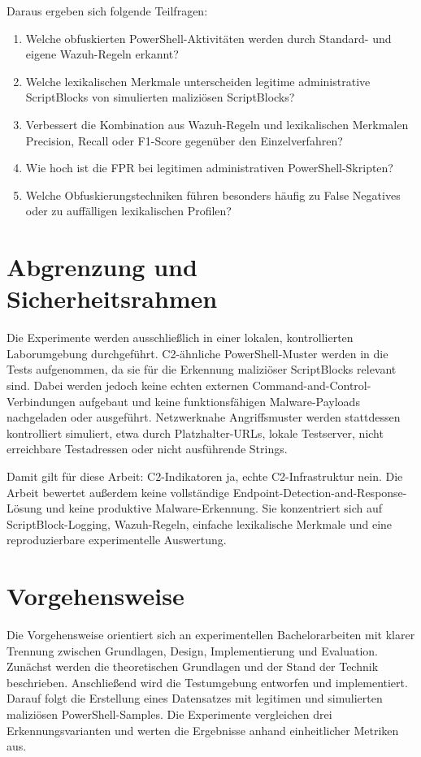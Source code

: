 \documentclass[12pt,a4paper,oneside,parskip=half]{scrreprt}
\begin{document}
Daraus ergeben sich folgende Teilfragen:
\begin{enumerate}[label=F\arabic*]
    \item Welche obfuskierten PowerShell-Aktivitäten werden durch Standard- und eigene Wazuh-Regeln erkannt?
    \item Welche lexikalischen Merkmale unterscheiden legitime administrative ScriptBlocks von simulierten maliziösen ScriptBlocks?
    \item Verbessert die Kombination aus Wazuh-Regeln und lexikalischen Merkmalen Precision, Recall oder F1-Score gegenüber den Einzelverfahren?
    \item Wie hoch ist die FPR bei legitimen administrativen PowerShell-Skripten?
    \item Welche Obfuskierungstechniken führen besonders häufig zu False Negatives oder zu auffälligen lexikalischen Profilen?
\end{enumerate}

\section{Abgrenzung und Sicherheitsrahmen}
Die Experimente werden ausschließlich in einer lokalen, kontrollierten Laborumgebung durchgeführt. C2-ähnliche PowerShell-Muster werden in die Tests aufgenommen, da sie für die Erkennung maliziöser ScriptBlocks relevant sind. Dabei werden jedoch keine echten externen Command-and-Control-Verbindungen aufgebaut und keine funktionsfähigen Malware-Payloads nachgeladen oder ausgeführt. Netzwerknahe Angriffsmuster werden stattdessen kontrolliert simuliert, etwa durch Platzhalter-URLs, lokale Testserver, nicht erreichbare Testadressen oder nicht ausführende Strings.

Damit gilt für diese Arbeit: C2-Indikatoren ja, echte C2-Infrastruktur nein. Die Arbeit bewertet außerdem keine vollständige Endpoint-Detection-and-Response-Lösung und keine produktive Malware-Erkennung. Sie konzentriert sich auf ScriptBlock-Logging, Wazuh-Regeln, einfache lexikalische Merkmale und eine reproduzierbare experimentelle Auswertung.

\section{Vorgehensweise}
Die Vorgehensweise orientiert sich an experimentellen Bachelorarbeiten mit klarer Trennung zwischen Grundlagen, Design, Implementierung und Evaluation. Zunächst werden die theoretischen Grundlagen und der Stand der Technik beschrieben. Anschließend wird die Testumgebung entworfen und implementiert. Darauf folgt die Erstellung eines Datensatzes mit legitimen und simulierten maliziösen PowerShell-Samples. Die Experimente vergleichen drei Erkennungsvarianten und werten die Ergebnisse anhand einheitlicher Metriken aus.
\end{document}
